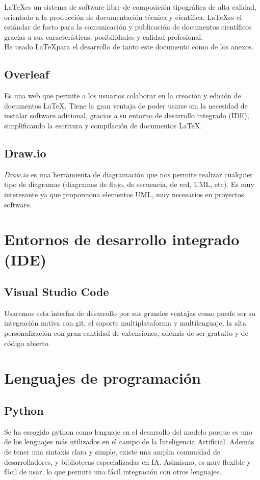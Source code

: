 \LaTeX es un sistema de software libre de composición tipográfica de alta calidad, orientado a la producción de documentación técnica y científica. \LaTeX es el estándar de facto para la comunicación y publicación de documentos científicos gracias a sus características, posibilidades y calidad profesional.\\
He usado \LaTeX para el desarrollo de tanto este documento como de los anexos.

\subsection{Overleaf}
Es una web que permite a los usuarios colaborar en la creación y edición de documentos LaTeX. Tiene la gran ventaja de poder usarse sin la necesidad de instalar software adicional, gracias a su entorno de desarrollo integrado (IDE), simplificando la escritura y compilación de documentos LaTeX.

\subsection{Draw.io}

\textit{Draw.io} es una herramienta de diagramación que nos permite realizar cualquier tipo de diagramas (diagramas de flujo, de secuencia, de red, UML, etc). Es muy interesante ya que proporciona elementos UML, muy necesarios en proyectos software.

\section{Entornos de desarrollo integrado (IDE)}

\subsection{Visual Studio Code}
Usaremos esta interfaz de desarrollo por sus grandes ventajas como puede ser su integración nativa con git, el soporte multiplataforma y multilenguaje, la alta personalización con gran cantidad de extensiones, además de ser gratuito y de código abierto.

\section{Lenguajes de programación}

\subsection{Python}
Se ha escogido python como lenguaje en el desarrollo del modelo porque es uno de los lenguajes más utilizados en el campo de la Inteligencia Artificial. Además de tener una sintaxis clara y simple, existe una amplia comunidad de desarrolladores, y bibliotecas especializadas en IA. Asimismo, es muy flexible y fácil de usar, lo que permite una fácil integración con otros lenguajes.


